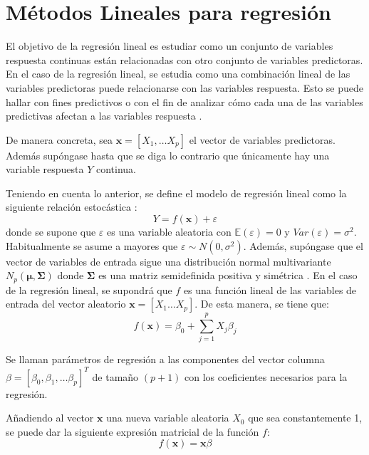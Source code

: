 \section{Métodos Lineales para regresión}

\noindent El objetivo de la regresión lineal es estudiar como un conjunto de variables respuesta continuas están relacionadas con otro conjunto de variables predictoras. En el caso de la regresión lineal, se estudia como una combinación lineal de las variables predictoras puede relacionarse con las variables respuesta. Esto se puede hallar con fines predictivos o con el fin de analizar cómo cada una de las variables predictivas afectan a las variables respuesta \cite{Johnson 2007}. 

\noindent De manera concreta, sea $\mathbf{x}=[X_1,\ldots X_p]$ el vector de variables predictoras. Además supóngase hasta que se diga lo contrario que únicamente hay una variable respuesta $Y$ continua. 

\noindent Teniendo en cuenta lo anterior, se define el modelo de regresión lineal como la siguiente relación estocástica \cite{Hastie 2001, Johnson 2007}:
\begin{equation}
Y=f(\textbf{x})+\varepsilon
\end{equation}
\noindent donde se supone que  $\varepsilon$ es una variable aleatoria con $\mathbb{E}(\varepsilon)=0$ y $Var(\varepsilon)=\sigma^2$. Habitualmente se asume a mayores que  $\varepsilon \sim N(0,\sigma^2)$. Además, supóngase que el vector de variables de entrada sigue una distribución normal multivariante $N_p(\mathbf{\mu},\mathbf{\Sigma})$ donde $\mathbf{\Sigma }$ es una matriz semidefinida positiva y simétrica \cite{Chatfield 1989}. 
\newpage
\noindent En el caso de la regresión lineal, se supondrá que $f$ es una función lineal de las variables de entrada del vector aleatorio $\textbf{x}=[X_1\ldots X_p]$. De esta manera, se tiene que:  
\begin{equation}
f(\textbf{x})=\beta_0+\sum_{j=1}^p X_j\beta_j
\end{equation}

\begin{defi}
Se llaman parámetros de regresión a las componentes del vector columna $\beta=[\beta_0, \beta_1, \ldots \beta_p]^T$ de tamaño $(p+1)$ con los coeficientes necesarios para la regresión. 
\end{defi} 

\noindent Añadiendo al vector $\mathbf{x}$ una nueva variable aleatoria $X_0$ que sea constantemente 1, se puede dar la siguiente expresión matricial de la función $f$:
\begin{equation}
f(\mathbf{x})= \mathbf{x}\beta
\end{equation}

